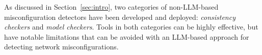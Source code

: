 
As discussed in Section~\ref{sec:intro}, two categories of non-LLM-based misconfiguration detectors have been developed and deployed: {\em consistency checkers} and {\em model checkers}. Tools in both categories can be highly effective, but have notable limitations that can be avoided with an LLM-based approach for detecting network misconfigurations.



